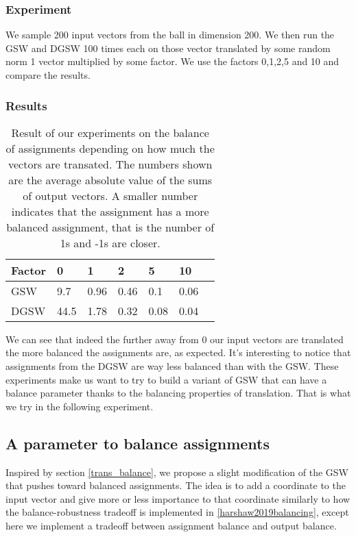 \documentclass[12pt]{article}
\begin{document}
\subsubsection{Experiment}
We sample 200 input vectors from the ball in dimension 200. We then run the GSW and DGSW 100 times each on those vector translated by some random norm 1 vector multiplied by some factor. We use the factors 0,1,2,5 and 10 and compare the results.

\subsubsection{Results}
\begin{center}
\begin{table}[h]
\begin{tabular}{l|llllll}
 Factor & 0 & 1  & 2 & 5 & 10  \\
\hline
GSW  & 9.7 & 0.96 & 0.46 & 0.1 & 0.06 \\
DGSW & 44.5 & 1.78 & 0.32 & 0.08 & 0.04
\end{tabular}
\caption{Result of our experiments on the balance of assignments depending on how much the vectors are transated. The numbers shown are the average absolute value of the sums of output vectors. A smaller number indicates that the assignment has a more balanced assignment, that is the number of 1s and -1s are closer.}
\label{balance_when_translated}
\end{table}
\end{center}

We can see that indeed the further away from 0 our input vectors are translated the more balanced the assignments are, as expected. It's interesting to notice that assignments from the DGSW are way less balanced than with the GSW. These experiments make us want to try to build a variant of GSW that can have a balance parameter thanks to the balancing properties of translation. That is what we try in the following experiment.

\subsection{A parameter to balance assignments}
Inspired by section \ref{trans_balance}, we propose a slight modification of the GSW that pushes toward balanced assignments. The idea is to add a coordinate to the input vector and give more or less importance to that coordinate similarly to how the balance-robustness tradeoff is implemented in \ref{harshaw2019balancing}, except here we implement a tradeoff between assignment balance and output balance.
\end{document}
